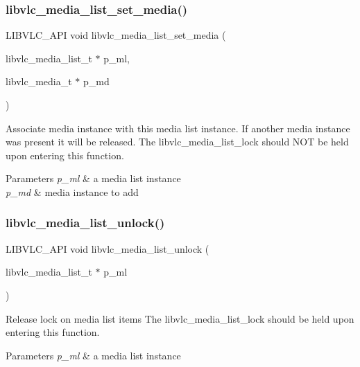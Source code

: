 \subsubsection{\texorpdfstring{libvlc\+\_\+media\+\_\+list\+\_\+set\+\_\+media()}{libvlc\_media\_list\_set\_media()}}
{\footnotesize\ttfamily L\+I\+B\+V\+L\+C\+\_\+\+A\+PI void libvlc\+\_\+media\+\_\+list\+\_\+set\+\_\+media (\begin{DoxyParamCaption}\item[{libvlc\+\_\+media\+\_\+list\+\_\+t $\ast$}]{p\+\_\+ml,  }\item[{libvlc\+\_\+media\+\_\+t $\ast$}]{p\+\_\+md }\end{DoxyParamCaption})}

Associate media instance with this media list instance. If another media instance was present it will be released. The libvlc\+\_\+media\+\_\+list\+\_\+lock should N\+OT be held upon entering this function.


\begin{DoxyParams}{Parameters}
{\em p\+\_\+ml} & a media list instance \\
\hline
{\em p\+\_\+md} & media instance to add \\
\hline
\end{DoxyParams}
\mbox{\label{group__libvlc__media__list_gaa91574447f7b7baa18e4054cf1957c51}} 
\subsubsection{\texorpdfstring{libvlc\+\_\+media\+\_\+list\+\_\+unlock()}{libvlc\_media\_list\_unlock()}}
{\footnotesize\ttfamily L\+I\+B\+V\+L\+C\+\_\+\+A\+PI void libvlc\+\_\+media\+\_\+list\+\_\+unlock (\begin{DoxyParamCaption}\item[{libvlc\+\_\+media\+\_\+list\+\_\+t $\ast$}]{p\+\_\+ml }\end{DoxyParamCaption})}

Release lock on media list items The libvlc\+\_\+media\+\_\+list\+\_\+lock should be held upon entering this function.


\begin{DoxyParams}{Parameters}
{\em p\+\_\+ml} & a media list instance \\
\hline
\end{DoxyParams}
